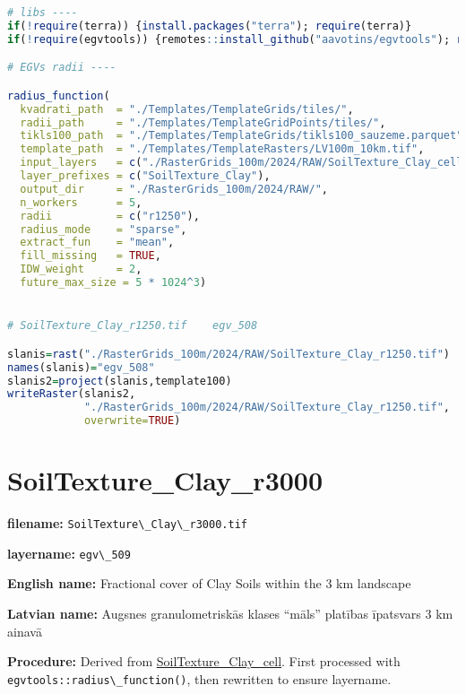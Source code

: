 \documentclass[
]{book}
\newcommand{\passthrough}[1]{#1}
\begin{document}
\begin{lstlisting}[language=R]
# libs ----
if(!require(terra)) {install.packages("terra"); require(terra)}
if(!require(egvtools)) {remotes::install_github("aavotins/egvtools"); require(egvtools)}

# EGVs radii ----

radius_function(
  kvadrati_path  = "./Templates/TemplateGrids/tiles/",
  radii_path     = "./Templates/TemplateGridPoints/tiles/",
  tikls100_path  = "./Templates/TemplateGrids/tikls100_sauzeme.parquet",
  template_path  = "./Templates/TemplateRasters/LV100m_10km.tif",
  input_layers   = c("./RasterGrids_100m/2024/RAW/SoilTexture_Clay_cell.tif"),
  layer_prefixes = c("SoilTexture_Clay"),
  output_dir     = "./RasterGrids_100m/2024/RAW/",
  n_workers      = 5,
  radii          = c("r1250"),
  radius_mode    = "sparse",
  extract_fun    = "mean",
  fill_missing   = TRUE,
  IDW_weight     = 2,
  future_max_size = 5 * 1024^3)


# SoilTexture_Clay_r1250.tif    egv_508

slanis=rast("./RasterGrids_100m/2024/RAW/SoilTexture_Clay_r1250.tif")
names(slanis)="egv_508"
slanis2=project(slanis,template100)
writeRaster(slanis2,
            "./RasterGrids_100m/2024/RAW/SoilTexture_Clay_r1250.tif",
            overwrite=TRUE)
\end{lstlisting}

\section{SoilTexture\_Clay\_r3000}\label{ch06.509}

\textbf{filename:} \passthrough{\lstinline!SoilTexture\_Clay\_r3000.tif!}

\textbf{layername:} \passthrough{\lstinline!egv\_509!}

\textbf{English name:} Fractional cover of Clay Soils within the 3 km landscape

\textbf{Latvian name:} Augsnes granulometriskās klases ``māls'' platības īpatsvars 3 km ainavā

\textbf{Procedure:} Derived from \hyperref[ch06.506]{SoilTexture\_Clay\_cell}. First processed
with \passthrough{\lstinline!egvtools::radius\_function()!}, then rewritten to ensure layername.
\end{document}
